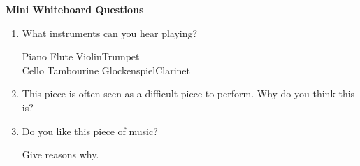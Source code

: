 \documentclass{article}
\begin{document}
\vspace{3em}

\begin{tcolorbox}[width=\textwidth]
\noindent\textbf{Mini Whiteboard Questions}

\vspace{1em}

\begin{enumerate}[leftmargin=1em, itemsep=0pt, parsep=0pt, topsep=0pt]
    \item What instruments can you hear playing?
    \vspace{1em}

    \begin{flushleft}
        Piano  \hfill Flute \hfill Violin\hfill Trumpet \\
\vspace{1em}
 Cello  \hfill Tambourine \hfill Glockenspiel\hfill Clarinet \\
        
    \end{flushleft}
    \vspace{1em}
    \item This piece is often seen as a difficult piece to perform. Why do you think this is?
    \vspace{1em}
    
    \item Do you like this piece of music?
    \vspace{1em}
    \par \noindent Give reasons why.
    \vspace{1em}
    


\end{enumerate}
\end{tcolorbox}
\newpage
\end{document}
